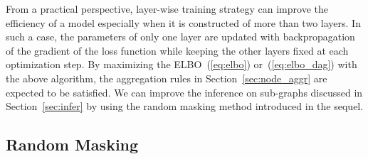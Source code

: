 \documentclass{article}
\begin{document}
From a practical perspective, layer-wise training strategy can improve the efficiency of a model especially when it is constructed of more than two layers. 
In such a case, the parameters of only one layer are updated with backpropagation of the gradient of the loss function while keeping the other layers fixed at each optimization step. 
By maximizing the ELBO~(\ref{eq:elbo}) or~(\ref{eq:elbo_dag}) with the above algorithm, the aggregation rules in Section~\ref{sec:node_aggr} are expected to be satisfied. 
We can improve the inference on sub-graphs discussed in Section~\ref{sec:infer} by using the random masking method introduced in the sequel.

\subsection{Random Masking}
\end{document}
